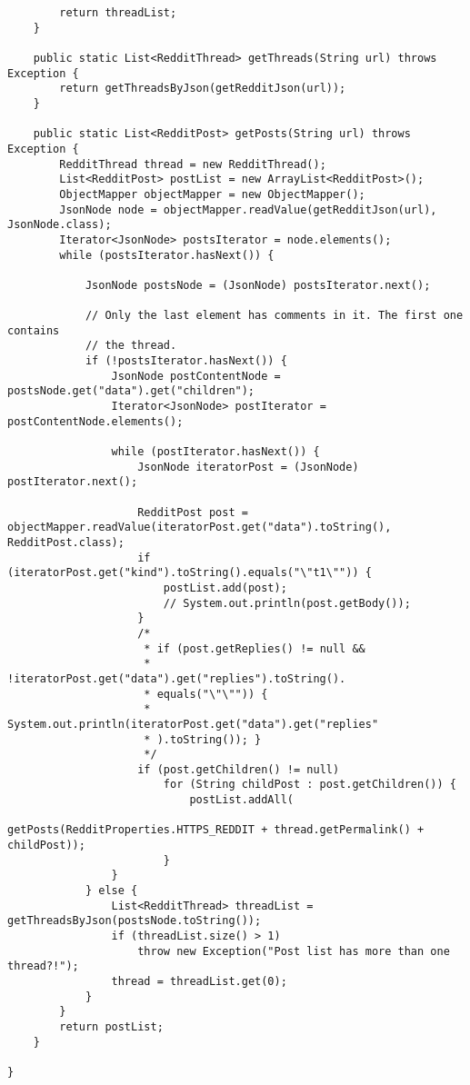 \begin{lstlisting}
		return threadList;
	}

	public static List<RedditThread> getThreads(String url) throws Exception {
		return getThreadsByJson(getRedditJson(url));
	}

	public static List<RedditPost> getPosts(String url) throws Exception {
		RedditThread thread = new RedditThread();
		List<RedditPost> postList = new ArrayList<RedditPost>();
		ObjectMapper objectMapper = new ObjectMapper();
		JsonNode node = objectMapper.readValue(getRedditJson(url), JsonNode.class);
		Iterator<JsonNode> postsIterator = node.elements();
		while (postsIterator.hasNext()) {

			JsonNode postsNode = (JsonNode) postsIterator.next();

			// Only the last element has comments in it. The first one contains
			// the thread.
			if (!postsIterator.hasNext()) {
				JsonNode postContentNode = postsNode.get("data").get("children");
				Iterator<JsonNode> postIterator = postContentNode.elements();

				while (postIterator.hasNext()) {
					JsonNode iteratorPost = (JsonNode) postIterator.next();

					RedditPost post = objectMapper.readValue(iteratorPost.get("data").toString(), RedditPost.class);
					if (iteratorPost.get("kind").toString().equals("\"t1\"")) {
						postList.add(post);
						// System.out.println(post.getBody());
					}
					/*
					 * if (post.getReplies() != null &&
					 * !iteratorPost.get("data").get("replies").toString().
					 * equals("\"\"")) {
					 * System.out.println(iteratorPost.get("data").get("replies"
					 * ).toString()); }
					 */
					if (post.getChildren() != null)
						for (String childPost : post.getChildren()) {
							postList.addAll(
									getPosts(RedditProperties.HTTPS_REDDIT + thread.getPermalink() + childPost));
						}
				}
			} else {
				List<RedditThread> threadList = getThreadsByJson(postsNode.toString());
				if (threadList.size() > 1)
					throw new Exception("Post list has more than one thread?!");
				thread = threadList.get(0);
			}
		}
		return postList;
	}

}
\end{lstlisting}

